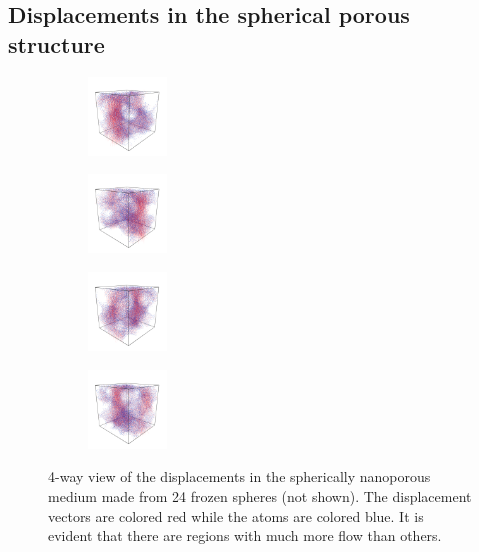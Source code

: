 \documentclass[reprint,floatfix,amsmath,amssymb,aps,pra]{revtex4-1}
\begin{document}
\subsection{Displacements in the spherical porous structure}

\begin{figure}
  \centering
  \begin{subfigure}
    \centering
    \includegraphics[width=0.23\textwidth]{../analysis/1k-permeability/runs/2013-04-05_201140/frozenpores24/4-way-1.png}
  \end{subfigure}
  \begin{subfigure}
    \centering
    \includegraphics[width=0.23\textwidth]{../analysis/1k-permeability/runs/2013-04-05_201140/frozenpores24/4-way-2.png}
  \end{subfigure}
  \begin{subfigure}
    \centering
    \includegraphics[width=0.23\textwidth]{../analysis/1k-permeability/runs/2013-04-05_201140/frozenpores24/4-way-3.png}
  \end{subfigure}
  \begin{subfigure}
    \centering
    \includegraphics[width=0.23\textwidth]{../analysis/1k-permeability/runs/2013-04-05_201140/frozenpores24/4-way-4.png}
  \end{subfigure}
  \caption{4-way view of the displacements in the spherically nanoporous medium made from 24 frozen spheres (not shown). The displacement vectors are colored red while the atoms are colored blue. It is evident that there are regions with much more flow than others.}
  \label{fig:4-way}
\end{figure}
\end{document}
